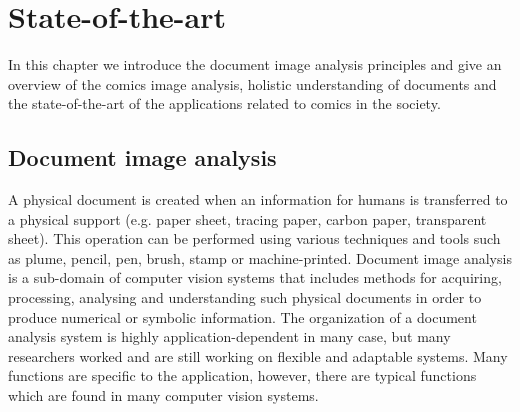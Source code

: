 \chapter{State-of-the-art} %
\label{chap:sota}
\graphicspath{{./chapters/2-sota/figs/}}




In this chapter we introduce the document image analysis principles and give an overview of the comics image analysis, holistic understanding of documents and the state-of-the-art of the applications related to comics in the society.


\section{Document image analysis} %
\label{sec:document_image_analysis}
A physical document is created when an information for humans is transferred to a physical support (e.g. paper sheet, tracing paper, carbon paper, transparent sheet).
This operation can be performed using various techniques and tools such as plume, pencil, pen, brush, stamp or machine-printed.
Document image analysis is a sub-domain of computer vision systems that includes methods for acquiring, processing, analysing and understanding such physical documents in order to produce numerical or symbolic information.
The organization of a document analysis system is highly application-dependent in many case, but many researchers worked and are still working on flexible and adaptable systems.
Many functions are specific to the application, however, there are typical functions which are found in many computer vision systems.

